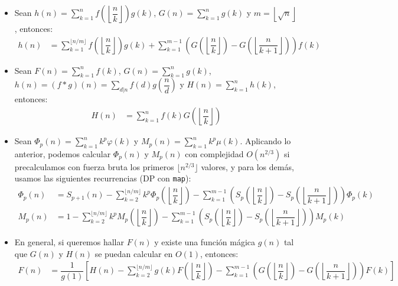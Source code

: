 \begin{itemize}
			\item Sean $\displaystyle h(n) = \sum_{k=1}^{n} f\left(\left\lfloor \dfrac{n}{k} \right\rfloor\right) g(k)$, $\displaystyle G(n)=\sum_{k=1}^{n}g(k)$ y $m=\left\lfloor \sqrt{n} \right\rfloor$, entonces:
			\begin{align*}
				h(n) &= \sum_{k=1}^{\lfloor n/m \rfloor}f\left(\left\lfloor \dfrac{n}{k} \right\rfloor\right) g(k) + \sum_{k=1}^{m-1} \left( G\left(\left\lfloor \dfrac{n}{k} \right\rfloor\right) - G\left(\left\lfloor \dfrac{n}{k+1} \right\rfloor\right) \right)f(k)
			\end{align*}
			
			\item Sean $\displaystyle F(n)=\sum_{k=1}^{n}f(k)$, $\displaystyle G(n)=\sum_{k=1}^{n}g(k)$, $\displaystyle h(n)=(f * g)(n)=\sum_{d | n}f(d)g\left(\dfrac{n}{d}\right)$ y $\displaystyle H(n)=\sum_{k=1}^{n}h(k)$, entonces:
			\begin{align*}
				H(n) &= \sum_{k=1}^{n}f(k)G\left(\left\lfloor \dfrac{n}{k} \right\rfloor\right)
			\end{align*}
			
			\item Sean $\displaystyle \Phi_p(n) = \sum_{k=1}^{n}k^p\varphi(k)$ y $\displaystyle M_p(n) = \sum_{k=1}^{n}k^p\mu(k)$. Aplicando lo anterior, podemos calcular $\Phi_p(n)$ y $M_p(n)$ con complejidad $O(n^{2/3})$ si precalculamos con fuerza bruta los primeros $\lfloor n^{2/3} \rfloor$ valores, y para los demás, usamos las siguientes recurrencias (DP con \texttt{map}):
			{\small
			\begin{align*}
				\Phi_p(n) &= S_{p+1}(n) - \sum_{k=2}^{\lfloor n/m \rfloor} k^p \Phi_p\left(\left\lfloor \dfrac{n}{k}  \right\rfloor\right) - \sum_{k=1}^{m-1} \left( S_p\left(\left\lfloor \dfrac{n}{k} \right\rfloor\right) - S_p\left(\left\lfloor \dfrac{n}{k+1} \right\rfloor\right) \right)\Phi_p(k) \\
				M_p(n) &= 1 - \sum_{k=2}^{\lfloor n/m \rfloor} k^p M_p\left(\left\lfloor \dfrac{n}{k}  \right\rfloor\right) - \sum_{k=1}^{m-1} \left( S_p\left(\left\lfloor \dfrac{n}{k} \right\rfloor\right) - S_p\left(\left\lfloor \dfrac{n}{k+1} \right\rfloor\right) \right)M_p(k)
			\end{align*}
			}
			
			\item En general, si queremos hallar $F(n)$ y existe una función mágica $g(n)$ tal que $G(n)$ y $H(n)$ se puedan calcular en $O(1)$, entonces:
			{\small
			\begin{align*}
				F(n) &= \dfrac{1}{g(1)} \left[ H(n) - \sum_{k=2}^{\lfloor n/m \rfloor} g(k)F\left(\left\lfloor \dfrac{n}{k} \right\rfloor\right) - \sum_{k=1}^{m-1} \left( G\left(\left\lfloor \dfrac{n}{k} \right\rfloor\right) - G\left(\left\lfloor \dfrac{n}{k+1} \right\rfloor\right) \right)F(k) \right]
			\end{align*}
			}
		\end{itemize}
		
